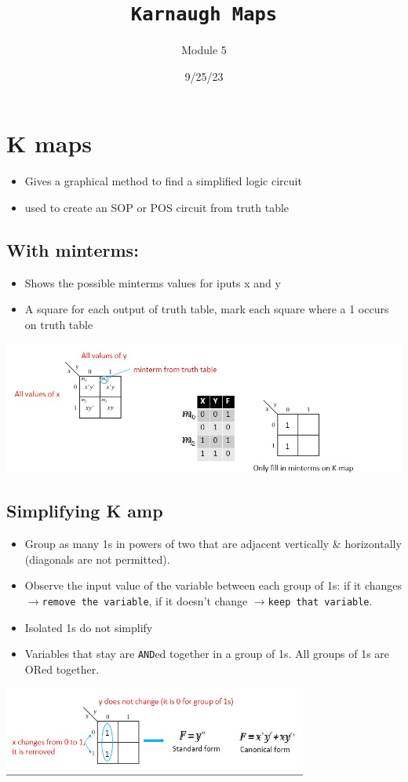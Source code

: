 \documentclass[a4paper,12pt]{article}
\title{\texttt{Karnaugh Maps}\\\hrulefill}
\author{Module 5}
\date{\small{9/25/23}}
\newcommand{\ra}{$\rightarrow$}
\begin{document}
    \maketitle

    \section{K maps}
      \begin{itemize}
        \item Gives a graphical method to  find a simplified logic circuit
        \item used to create an SOP or POS circuit from truth table
      \end{itemize}
      
      \subsection*{With minterms:}
          \begin{itemize}
            \item Shows the possible minterms values for iputs x and y
            \item A square for each output of truth table, mark each square where a 1 occurs on truth table
          \end{itemize}
          \includegraphics*[width=17cm]{kmap Example1.jpg}

          \subsection*{Simplifying K amp}
            \begin{itemize}
              \item Group as many 1s in powers of two that are adjacent vertically \& horizontally (diagonals are not permitted).
              \item Observe the input value of the variable between each group of 1s: if it changes \ra \texttt{remove the variable}, if it doesn't change \ra \texttt{keep that variable}.
              \item Isolated 1s do not simplify
              \item Variables that stay are \texttt{AND}ed together in a group of 1s. All groups of 1s are ORed together.
            \end{itemize}
            \includegraphics*[width=10cm]{kmap Example2.jpg}
\end{document}
